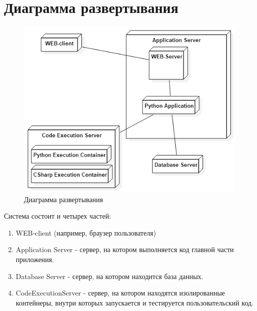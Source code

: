 \documentclass{article}
\begin{document}
    
    \section{Диаграмма развертывания}
    \begin{figure}[H]
        \includegraphics[width=\textwidth, center]
        {DeploymentDiagram.png}
        \caption{Диаграмма развертывания}
    \end{figure}
    Система состоит и четырех частей:
    \begin{enumerate}
        \item WEB-client (например, браузер пользователя)
        \item Application Server - сервер, на котором выполняется
        код главной части приложения.
        \item Database Server - сервер, на котором находится
        база данных.
        \item CodeExecutionServer - сервер, на котором
        находятся изолированные контейнеры, внутри которых
        запускается и тестируется пользовательский код.
    \end{enumerate}
    
\end{document}
